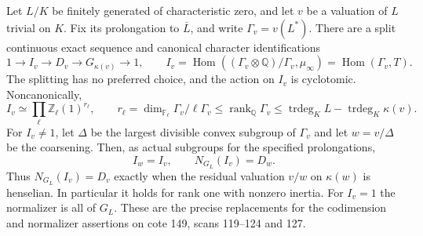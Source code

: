 \begin{proposition}
\label{F-valuation-structure}
Let $L/K$ be finitely generated of characteristic zero, and let
$v$ be a valuation of $L$ trivial on $K$. Fix its prolongation to
$\overline L$, and write $\Gamma_v=v(L^*)$. There are a split
continuous exact sequence and canonical character identifications
\[
 1\longrightarrow I_v\longrightarrow D_v
   \longrightarrow G_{\kappa(v)}\longrightarrow1,
 \qquad
 I_v=\operatorname{Hom}((\Gamma_v\otimes\mathbb Q)/\Gamma_v,
                         \mu_\infty)
     =\operatorname{Hom}(\Gamma_v,T).
\]
The splitting has no preferred choice, and the action on $I_v$
is cyclotomic. Noncanonically,
\[
 I_v\simeq\prod_\ell\mathbb Z_\ell(1)^{r_\ell},\qquad
 r_\ell=\dim_{\mathbb F_\ell}\Gamma_v/\ell\Gamma_v
 \leq\operatorname{rank}_{\mathbb Q}\Gamma_v
 \leq\operatorname{trdeg}_K L-\operatorname{trdeg}_K\kappa(v).
\]
For $I_v\ne1$, let $\Delta$ be the largest divisible convex
subgroup of $\Gamma_v$ and let $w=v/\Delta$ be the coarsening.
Then, as actual subgroups for the specified prolongations,
\[
 I_w=I_v,\qquad N_{G_L}(I_v)=D_w.
\]
Thus $N_{G_L}(I_v)=D_v$ exactly when the residual valuation
$v/w$ on $\kappa(w)$ is henselian. In particular it holds for
rank one with nonzero inertia. For $I_v=1$ the normalizer is
all of $G_L$. These are the precise replacements for the
codimension and normalizer assertions on cote 149, scans
119--124 and 127.
\end{proposition}
